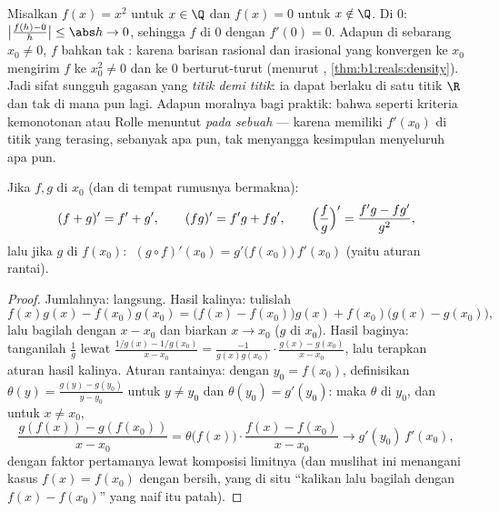 \begin{example}\label{ex:b1:derivative:onepoint}
Misalkan $f(x) = x^2$ untuk $x \in \Q$ dan $f(x) = 0$ untuk $x \notin
\Q$. Di $0$: $\bigl|\frac{f(h) - 0}{h}\bigr| \leq \abs h \to 0$,
sehingga $f$  di $0$ dengan $f'(0) = 0$. Adapun di sebarang $x_0
\neq 0$, $f$ bahkan tak : karena barisan rasional dan irasional
yang konvergen ke $x_0$ mengirim $f$ ke $x_0^2 \neq 0$ dan ke
$0$ berturut-turut (menurut , \cref{thm:b1:reals:density}). Jadi
sifat  sungguh gagasan yang \emph{titik demi titik}: ia dapat
berlaku di satu titik $\R$ dan tak di mana pun lagi. Adapun moralnya bagi
praktik: bahwa  seperti kriteria kemonotonan atau Rolle
menuntut  \emph{pada sebuah } --- karena memiliki
$f'(x_0)$ di titik yang terasing, sebanyak apa pun, tak menyangga kesimpulan
menyeluruh apa pun.
\end{example}

\begin{theorem}[Operasi]\label{thm:b1:derivative:operations}
Jika $f, g$  di $x_0$ (dan di tempat rumusnya
bermakna):
\[
(f + g)' = f' + g', \qquad
(fg)' = f'g + fg', \qquad
\Bigl(\frac fg\Bigr)' = \frac{f'g - fg'}{g^2},
\]
lalu jika $g$  di $f(x_0)$:
$\;(g \circ f)'(x_0) = g'\bigl(f(x_0)\bigr)\, f'(x_0)$ (yaitu aturan
rantai).
\end{theorem}

\begin{proof}
Jumlahnya: langsung. Hasil kalinya: tulislah
\[
f(x)g(x) - f(x_0)g(x_0)
= \bigl(f(x) - f(x_0)\bigr) g(x) + f(x_0)\bigl(g(x) - g(x_0)\bigr),
\]
lalu bagilah dengan $x - x_0$ dan biarkan $x \to x_0$ ($g$  di $x_0$).
Hasil baginya: tanganilah $\frac 1g$ lewat $\frac{1/g(x) - 1/g(x_0)}{x - x_0} =
\frac{-1}{g(x)g(x_0)}\cdot\frac{g(x) - g(x_0)}{x - x_0}$, lalu terapkan
aturan hasil kalinya. Aturan rantainya: dengan $y_0 = f(x_0)$, definisikan
$\theta(y) = \frac{g(y) - g(y_0)}{y - y_0}$ untuk $y \neq y_0$ dan
$\theta(y_0) = g'(y_0)$: maka $\theta$  di $y_0$, dan untuk
$x \neq x_0$,
\[
\frac{g(f(x)) - g(f(x_0))}{x - x_0}
= \theta\bigl(f(x)\bigr)\cdot \frac{f(x) - f(x_0)}{x - x_0}
\longrightarrow g'(y_0)\, f'(x_0),
\]
dengan faktor pertamanya lewat komposisi limitnya (dan muslihat ini menangani
kasus $f(x) = f(x_0)$ dengan bersih, yang di situ ``kalikan lalu bagilah
dengan $f(x) - f(x_0)$'' yang naif itu patah).
\end{proof}

